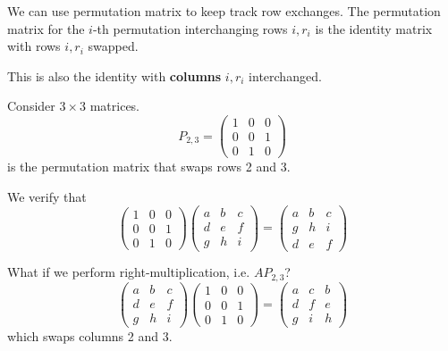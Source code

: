 We can use permutation matrix to keep track row exchanges. The permutation matrix for the \(i\)-th permutation interchanging rows \( i, r_i \) is the identity matrix with rows \( i, r_i \) swapped.

\begin{remark}
    This is also the identity with \textbf{columns} \( i, r_i \) interchanged.
\end{remark}

\begin{example}
    Consider \( 3 \times 3 \) matrices. \[
        P_{2,3} = \begin{pmatrix}
            1 & 0 & 0 \\
            0 & 0 & 1 \\
            0 & 1 & 0
        \end{pmatrix}
    \] is the permutation matrix that swaps rows 2 and 3.

    We verify that \[
        \begin{pmatrix}
            1 & 0 & 0 \\
            0 & 0 & 1 \\
            0 & 1 & 0
        \end{pmatrix}
        \begin{pmatrix}
            a & b & c \\
            d & e & f \\
            g & h & i
        \end{pmatrix} =
        \begin{pmatrix}
            a & b & c \\
            g & h & i \\
            d & e & f
        \end{pmatrix}
    \]

    What if we perform right-multiplication, i.e. \( A P_{2,3} \)? \[
        \begin{pmatrix}
            a & b & c \\
            d & e & f \\
            g & h & i
        \end{pmatrix}
        \begin{pmatrix}
            1 & 0 & 0 \\
            0 & 0 & 1 \\
            0 & 1 & 0
        \end{pmatrix} =
        \begin{pmatrix}
            a & c & b \\
            d & f & e \\
            g & i & h
        \end{pmatrix}
    \] which swaps columns 2 and 3.
\end{example}


